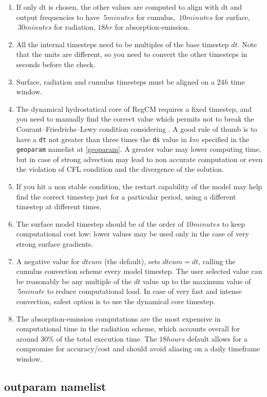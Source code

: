 \begin{enumerate}
\item If only dt is chosen, the other values are computed to align with dt
and output frequencies to have $~5minutes$ for cumulus, $~10minutes$ for
surface, $~30 minutes$ for radiation, $18hr$ for absorption-emission.
\item All the internal timesteps need to be multiples of the base
timestep $dt$.  Note that the units are different, so you need to convert the
other timesteps in seconds before the check.
\item Surface, radiation and cumulus timesteps must be aligned on a $24h$
time window.
\item The dynamical hydrostatical core of RegCM requires a fixed timestep,
and you need to manually find the correct value which permits not to break
the Courant–Friedrichs–Lewy condition considering \cite{CFL}.
A good rule of thumb is to have a \verb=dt= not greater than three times
the \verb=ds= value in $km$ specified in the \verb=geoparam= namelist at
\ref{geoparam}.
A greater value may lower computing time, but in case of strong advection
may lead to non accurate computation or even the violation of CFL condition
and the divergence of the solution.
\item If you hit a non stable condition, the restart capability of the model
may help find the correct timestep just for a particular period, using a
different timestep at different times.
\item The surface model timestep should be of the order of $10 minutes$ to
keep computational cost low: lower values may be used only in the case of
very strong surface gradients.
\item A negative value for $dtcum$ (the default), sets $dtcum = dt$,
calling the cumulus convection scheme every model timestep. The user selected
value can be reasonably be any multiple of the $dt$ value up to the
maximum value of $~5minute$ to reduce computational load.
In case of very fast and intense convection, safest option is to use the
dynamical core timestep.
\item The absorption-emission computations are the most expensive in
computational time in the radiation scheme, which accounts overall for
around $30\%$ of the total execution time. The $18 hours$ default
allows for a compromise for accuracy/cost and should avoid aliasing on a
daily timeframe window.
\end{enumerate}

\subsection{outparam namelist}

